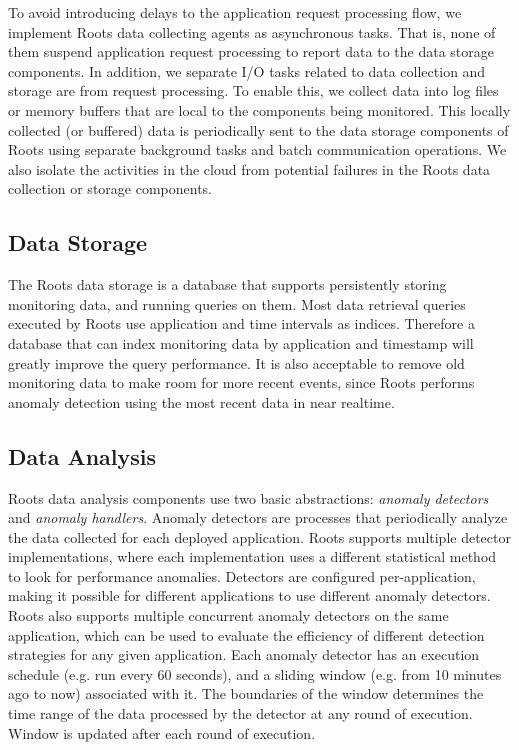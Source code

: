 To avoid introducing delays to the application request processing flow, we implement
Roots data collecting agents as asynchronous tasks. That is, none of them 
suspend application request processing to report data to the data storage components.
In addition,  we separate I/O tasks related to data collection and storage are
from request processing.
To enable this, we collect data into log files or memory buffers that are local to the 
components being monitored. This locally collected (or buffered) data is periodically sent
to the data storage components of Roots using separate background tasks and batch communication
operations. We also isolate the activities in the cloud from potential
failures in the Roots data collection or storage components.

\subsection{Data Storage}

The Roots data storage is a database that supports persistently storing monitoring data, and running
queries on them.  
Most data retrieval queries executed
by Roots use application and time intervals as indices. Therefore a database that can index monitoring
data by application and timestamp will greatly improve the query performance.
It is also acceptable to remove old monitoring data to make room for more recent events, since Roots
performs anomaly detection using the most recent data in near realtime.

\subsection{Data Analysis}

Roots data analysis components use two basic abstractions: \textit{anomaly detectors} 
and \textit{anomaly handlers}.
Anomaly detectors are processes that periodically analyze the data collected for
each deployed application. Roots supports multiple detector implementations, where each implementation
uses a different statistical method to look for performance anomalies. Detectors are configured
per-application, making it possible for different applications to use different anomaly 
detectors. Roots also supports multiple concurrent anomaly detectors on the same application, which can be used
to evaluate the efficiency of different detection strategies for any given application. Each
anomaly detector has an execution schedule (e.g. run every 60 seconds), and a sliding window 
(e.g. from 10 minutes ago to now)
associated with it. The boundaries of the window determines the time range
of the data processed by the detector at any round of execution. Window is updated 
after each round of execution. 

